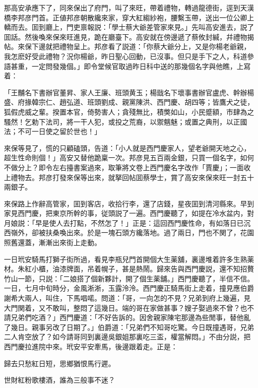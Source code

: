 那高安承應下了，同來保出了府門，叫了來旺，帶着禮物，轉過龍德街，逕到天漢橋李邦彦門首。正値邦彦朝散纔來家，穿大紅縐紗袍，腰繫玉帶，送出一位公卿上轎而去。囬到廳上，門吏禀報説：「學士蔡大爺差管家來見。」先叫高安進去，説了囬話。然後喚來保來旺進見，跪在廳臺下。高安就在傍邊遞了蔡攸封緘，幷禮物揭帖。來保下邊就把禮物呈上。邦彦看了説道：「你蔡大爺分上，又是你楊老爺親，我怎麽好受此禮物？況你楊爺，昨日聖心回動，已沒事。但只是手下之人，科道參語甚重，一定問發幾個。」即令堂候官取過昨日科中送的那幾個名字與他瞧，上寫着：

\begin{myquote}[\markfont]
「王黼名下書辦官董昇、家人王廉、班頭黄玉；楊戩名下壞事書辦官盧虎、幹辦楊盛、府掾韓宗仁、趙弘道、班頭劉成、親黨陳洪、西門慶、胡四等；皆鷹犬之徒，狐假虎威之輩。揆置本官，倚勢害人；貪殘無比，積獘如山，小民蹙額，巿肆為之騷然！乞勅下法司，將一干人犯，或投之荒裔，以禦魑魅；或置之典刑，以正國法；不可一日使之留於世也！」
\end{myquote}

來保等見了，慌的只顧磕頭，告道：「小人就是西門慶家人，望老爺開天地之心，超生性命則個！」高安又替他跪稟一次。邦彦見五百兩金銀，只買一個名字，如何不做分上？即令左右擡書案過來，取筆將文卷上西門慶名字改作「賈慶」；一面收上禮物去。邦彦打發來保等出來，就拏回帖囬蔡學士，賞了高安來保來旺一封五十兩銀子。

來保路上作辭高管家，囬到客店，收拾行李，還了店錢，星夜囬到清河縣來。早到家見西門慶，把東京所幹的事，従頭説了一遍。西門慶聽了，如提在冷水盆内，對月娘説：「早是使人去打點，不然怎了！」正是：這回西門慶性命，有如落日已沉西嶺外，卻被扶桑喚出來。於是一塊石頭方纔落地。過了兩日，門也不関了，花園照舊還蓋，漸漸出來街上走動。

一日玳安騎馬打獅子街所過，看見李瓶兒門首開個大生薬舖，裏邊堆着許多生熟薬材。朱紅小櫃，油漆牌面，吊着幌子，甚是熱鬧。歸來告與西門慶説，還不知招贅竹山一節，只説：「二娘搭了個新夥計，開了個生薬舖。」西門慶聽了，半信不信。一日，七月中旬時分，金風淅淅，玉露泠泠。西門慶正騎馬街上走着，撞見應伯爵謝希大兩人，叫住，下馬唱喏。問道：「哥，一向怎的不見？兄弟到府上幾遍，見大門関着，又不敢叫，整悶了這幾日。端的哥在家做甚事？嫂子娶過來不曾？也不請兄弟們吃酒？」西門慶道：「不好告訴的。因舍親家陳宅那邊為些閒事，替他亂了幾日。親事另改了日期了。」伯爵道：「兄弟們不知哥吃驚。今日既撞遇哥，兄弟二人肯空放了？如今請哥同到裏邊吳銀姐那裏吃三盃，權當解悶。」不由分説，把西門慶拉進院中來。玳安平安牽馬，後邊跟着走。正是：

\begin{myquote}
歸去只愁紅日短，思鄉猶恨馬行遲。

世財紅粉歌樓酒，誰為三般事不迷？
\end{myquote}

